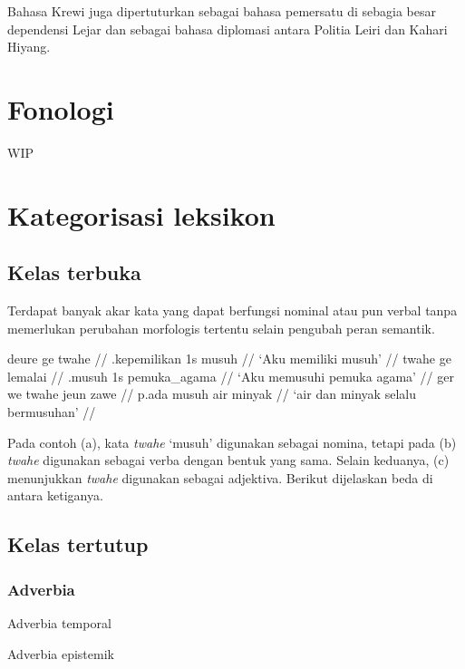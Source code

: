 \documentclass[12pt,oneside]{book}
\begin{document}
Bahasa Krewi juga dipertuturkan sebagai bahasa pemersatu di sebagia besar dependensi Lejar dan sebagai bahasa diplomasi antara Politia Leiri dan Kahari Hiyang.

\chapter{Fonologi}
WIP


\chapter{Kategorisasi leksikon}
\section{Kelas terbuka}
Terdapat banyak akar kata yang dapat berfungsi nominal atau pun verbal tanpa memerlukan perubahan morfologis tertentu selain pengubah peran semantik.

\pex
\a
\begingl
\gla deure ge twahe //
.kepemilikan {\sc 1s} musuh //
\glft `Aku memiliki musuh' //
\endgl
\a
\begingl
\gla twahe ge lemalai //
.musuh {\sc 1s} pemuka\_agama //
\glft `Aku memusuhi pemuka agama' //
\endgl
\a
\begingl
\gla ger we twahe jeun zawe //
 {\sc p.}ada musuh air minyak // 
\glft `air dan minyak selalu bermusuhan' //
\endgl
\xe

Pada contoh (\lastx a), kata \emph{twahe} `musuh' digunakan sebagai nomina, tetapi pada (\lastx b) \emph{twahe} digunakan sebagai verba dengan bentuk yang sama. Selain keduanya, (\lastx c) menunjukkan \emph{twahe} digunakan sebagai adjektiva. Berikut dijelaskan beda di antara ketiganya.

\section{Kelas tertutup}
\subsection{Adverbia}
\ex Adverbia temporal\par\nobreak\medskip 
\quad\vbox{}\xe

\ex Adverbia epistemik\par\nobreak\medskip
\quad\vbox{}\xe
\end{document}
